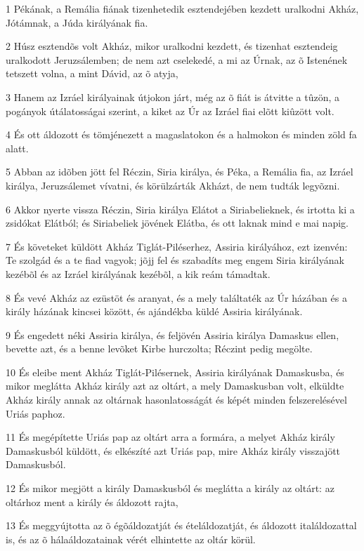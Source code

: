 \par 1 Pékának, a Remália fiának tizenhetedik esztendejében kezdett uralkodni Akház, Jótámnak, a Júda királyának fia.
\par 2 Húsz esztendõs volt Akház, mikor uralkodni kezdett, és tizenhat esztendeig uralkodott Jeruzsálemben; de nem azt cselekedé, a mi az Úrnak, az õ Istenének tetszett volna, a mint Dávid, az õ atyja,
\par 3 Hanem az Izráel királyainak útjokon járt, még az õ fiát is átvitte a tûzön, a pogányok útálatosságai szerint, a kiket az Úr az Izráel fiai elõtt kiûzött volt.
\par 4 És ott áldozott és tömjénezett a magaslatokon és a halmokon és minden zöld fa alatt.
\par 5 Abban az idõben jött fel Réczin, Siria királya, és Péka, a Remália fia, az Izráel királya, Jeruzsálemet vívatni, és körülzárták Akházt, de nem tudták  legyõzni.
\par 6 Akkor nyerte vissza Réczin, Siria királya Elátot a Siriabelieknek, és irtotta ki a zsidókat Elátból; és Siriabeliek jövének Elátba, és ott laknak mind e mai napig.
\par 7 És követeket küldött Akház Tiglát-Piléserhez, Assiria királyához, ezt izenvén: Te szolgád és a te fiad vagyok; jõjj fel és szabadíts meg engem Siria  királyának kezébõl és az Izráel királyának kezébõl, a kik reám támadtak.
\par 8 És vevé Akház az ezüstöt és aranyat, és a mely találtaték az Úr házában és a király házának kincsei között, és ajándékba küldé Assiria királyának.
\par 9 És engedett néki Assiria királya, és feljövén Assiria királya Damaskus ellen, bevette azt, és a benne levõket Kirbe hurczolta; Réczint pedig megölte.
\par 10 És eleibe ment Akház Tiglát-Pilésernek, Assiria királyának Damaskusba, és mikor meglátta Akház király azt az oltárt, a mely Damaskusban volt, elküldte Akház király annak az oltárnak hasonlatosságát és képét minden felszerelésével Uriás paphoz.
\par 11 És megépítette Uriás pap az oltárt arra a formára, a melyet Akház király Damaskusból küldött, és elkészíté azt Uriás pap, mire Akház király visszajött Damaskusból.
\par 12 És mikor megjött a király Damaskusból és meglátta a király az oltárt: az oltárhoz ment a király és áldozott rajta,
\par 13 És meggyújtotta az õ égõáldozatját és ételáldozatját, és áldozott italáldozattal is, és az õ hálaáldozatainak vérét elhintette az oltár körül.
